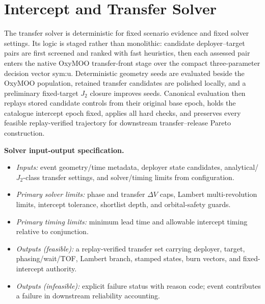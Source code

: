     \section{Intercept and Transfer Solver} \label{se:transfer-solver}
    The transfer solver is deterministic for fixed scenario evidence and fixed solver settings. Its logic is staged rather than monolithic: candidate deployer--target pairs are first screened and ranked with fast heuristics, then each assessed pair enters the native OxyMOO  transfer-front stage over the compact three-parameter decision vector \gls{sym:u}. Deterministic geometry seeds are evaluated beside the OxyMOO population, retained transfer candidates are polished locally, and a preliminary fixed-target \(J_2\) closure improves seeds. Canonical evaluation then replays stored candidate controls from their original base epoch, holds the catalogue intercept epoch fixed, applies all hard checks, and preserves every feasible replay-verified trajectory for downstream transfer--release Pareto construction.

    \noindent\textbf{Solver input-output specification.}
    \begin{itemize}[leftmargin=*]
        \item \emph{Inputs:} event geometry/time metadata, deployer state candidates, analytical/\(J_2\)-class transfer settings, and solver/timing limits from configuration.
        \item \emph{Primary solver limits:} phase and transfer \(\Delta V\) caps, Lambert multi-revolution limits, intercept tolerance, shortlist depth, and orbital-safety guards.
        \item \emph{Primary timing limits:} minimum lead time and allowable intercept timing relative to conjunction.
        \item \emph{Outputs (feasible):} a replay-verified transfer set carrying deployer, target, phasing/wait/TOF, Lambert branch, stamped states, burn vectors, and fixed-intercept authority.
        \item \emph{Outputs (infeasible):} explicit failure status with reason code; event contributes a failure in downstream reliability accounting.
    \end{itemize}

